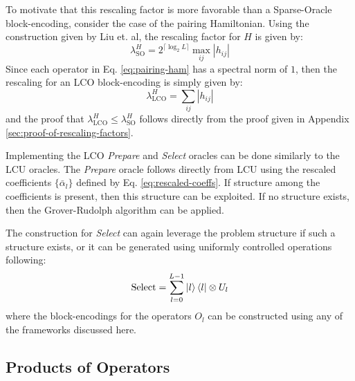 To motivate that this rescaling factor is more favorable than a Sparse-Oracle block-encoding, consider the case of the pairing Hamiltonian.
Using the construction given by Liu et. al, the rescaling factor for $H$ is given by:
\begin{equation}
    \lambda_\text{SO}^H = 2^{\lceil \log_2 L \rceil} \max_{ij} |h_{ij}|
\end{equation}
Since each operator in Eq. \ref{eq:pairing-ham} has a spectral norm of $1$, then the rescaling for an LCO block-encoding is simply given by:
\begin{equation}
    \lambda_\text{LCO}^H = \sum_{ij} |h_{ij}|
\end{equation}
and the proof that $\lambda_\text{LCO}^H \leq \lambda_\text{SO}^H$ follows directly from the proof given in Appendix \ref{sec:proof-of-rescaling-factors}.

Implementing the LCO \textit{Prepare} and \textit{Select} oracles can be done similarly to the LCU oracles.
The \textit{Prepare} oracle follows directly from LCU using the rescaled coefficients $\{\bar{\alpha}_l\}$ defined by Eq. \ref{eq:rescaled-coeffs}. 
If structure among the coefficients is present, then this structure can be exploited. 
If no structure exists, then the Grover-Rudolph algorithm can be applied.

The construction for \textit{Select} can again leverage the problem structure if such a structure exists, or it can be generated using uniformly controlled operations following:
\begin{equation}
    \label{eq:select-lco}
    \text{Select} = \sum_{l=0}^{L-1} \ket{l}\bra{l} \otimes U_l
\end{equation}
where the block-encodings for the operators $O_l$ can be constructed using any of the frameworks discussed here.

\subsection{Products of Operators}
\label{subsec:be-products}

